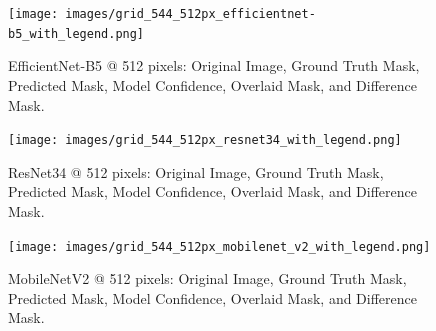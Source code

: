 \documentclass[a4paper]{article}
\begin{document}
\begin{figure}[!htbp]
    \centering
    \begin{minipage}{\textwidth}
        \centering
        \texttt{[image: images/grid\_544\_512px\_efficientnet-b5\_with\_legend.png]}
        \caption{EfficientNet-B5 @ 512 pixels: Original Image, Ground Truth Mask, Predicted Mask, Model Confidence, Overlaid Mask, and Difference Mask.}
        \label{fig:grid_544_@512px_efficientnet-b5_with_legend}
    \end{minipage}
    
    \vspace{0pt} %
    
    \begin{minipage}{\textwidth}
        \centering
        \texttt{[image: images/grid\_544\_512px\_resnet34\_with\_legend.png]}
        \caption{ResNet34 @ 512 pixels: Original Image, Ground Truth Mask, Predicted Mask, Model Confidence, Overlaid Mask, and Difference Mask.}
        \label{fig:grid_544_@512px_resnet34_with_legend}
    \end{minipage}
    
    \vspace{0pt} %
    
    \begin{minipage}{\textwidth}
        \centering
        \texttt{[image: images/grid\_544\_512px\_mobilenet\_v2\_with\_legend.png]}
        \caption{MobileNetV2 @ 512 pixels: Original Image, Ground Truth Mask, Predicted Mask, Model Confidence, Overlaid Mask, and Difference Mask.}
        \label{fig:grid_544_@512px_mobilenet_v2_with_legend}
    \end{minipage}
\end{figure}

    
    
\end{document}

